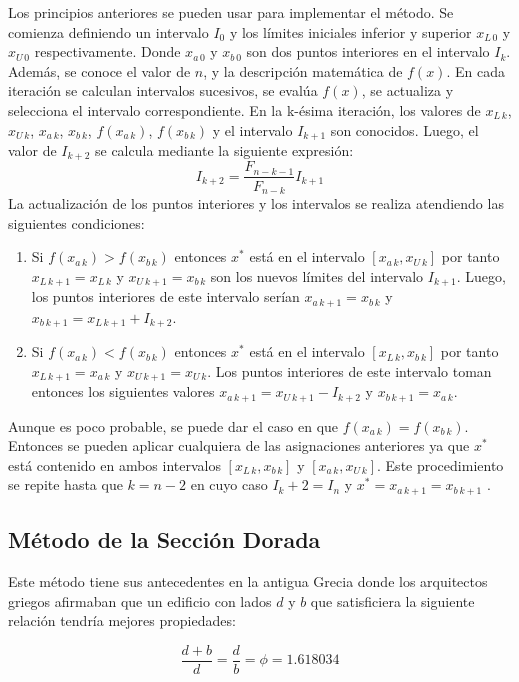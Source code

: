 Los principios anteriores se pueden usar para implementar el método. Se comienza definiendo un intervalo $I_0$ y los  límites iniciales inferior y superior $x_{L\,0}$ y $x_{U\,0}$ respectivamente. Donde $x_{a\,0}$ y  $x_{b\,0}$ son dos puntos interiores en el intervalo $I_k$. Además, se conoce el valor de $n$, y la descripción matemática de $f(x)$. En cada iteración se calculan intervalos sucesivos, se evalúa $f(x)$, se actualiza y selecciona el intervalo correspondiente. En la k-ésima iteración, los valores de  $x_{L\,k}$, $x_{U\,k}$, $x_{a\,k}$, $x_{b\,k}$, $f(x_{a\,k})$,  $f(x_{b\,k})$ y el intervalo $I_{k + 1}$ son conocidos. Luego, el valor de $I_{k + 2}$ se calcula mediante la siguiente expresión:
\begin{equation}
 I_{k+2} = \frac{F_{n-k-1}}{ F_{n-k}}I_{k+1}
 \end{equation}
La actualización de los puntos interiores y los intervalos se realiza atendiendo las siguientes condiciones:
\begin{enumerate}
\item Si $f(x_{a\,k}) > f(x_{b\,k})$ entonces $x^*$ está en el intervalo $[ x_{a\,k}, x_{U\,k}]$ por tanto $ x_{L\,k+1} =x_{L\,k}$ y $ x_{U\,k+1} =x_{b\,k}$  son los nuevos límites del intervalo  $I_{k + 1}$. Luego, los puntos interiores de este intervalo serían $x_{a\,k+1} =x_{b\,k}$ y  $x_{b\,k+1} =x_{L\,k+1}+I_{k+2}$.

\item Si $f(x_{a\,k}) < f(x_{b\,k})$ entonces $x^*$ está en el intervalo $[x_{L\,k}, x_{b\,k}]$ por tanto $ x_{L\,k+1} =x_{a\,k}$ y $ x_{U\,k+1} =x_{U\,k}$. Los puntos interiores de este intervalo toman entonces los siguientes valores $x_{a\,k+1} =x_{U\,k+1}-I_{k+2}$ y  $x_{b\,k+1} =x_{a\,k}$.
\end{enumerate}

Aunque es poco probable, se puede dar el caso en que $f(x_{a\,k}) = f(x_{b\,k})$. Entonces se pueden aplicar cualquiera de las asignaciones anteriores ya que $x^*$ está contenido en ambos intervalos  $[x_{L\,k}, x_{b\,k}]$ y  $[ x_{a\,k}, x_{U\,k}]$. Este procedimiento se repite hasta que $k = n - 2$ en cuyo caso $I_k + 2 = I_n$ y $x^* = x_{a\,k+1} =  x_{b\,k+1}$ \cite{antoniou_practical_2007}.

\subsection{Método de la Sección Dorada}
Este método tiene sus antecedentes en la antigua Grecia donde los arquitectos griegos afirmaban que un edificio con lados $d$ y $b$ que satisficiera la siguiente relación tendría mejores propiedades:
\begin{center}
\begin{equation}
\frac{d+b}{d}=\frac{d}{b}= \phi=1.618034
\end{equation}
\end{center}

